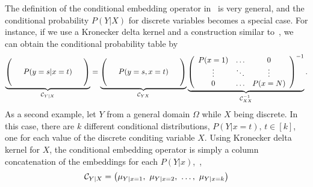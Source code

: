 \documentclass[11pt]{article}
\begin{document}
The definition of the conditional embedding operator in~ is very general, and the conditional probability $P(Y|X)$ for discrete variables becomes a special case. For instance, if we use a Kronecker delta kernel and a construction similar to~, we can obtain the conditional probability table by
\begin{align}
    \underbrace{\left(
        \begin{array}{ccc}
             &  &  \cr
            &  P(y=s|x=t) & \cr
            & &
        \end{array}
    \right)}_{\mathcal{C}_{Y|X}}
    =
    \underbrace{
    \left(
        \begin{array}{ccc}
            & & \cr
            & P(y=s, x=t) & \cr
            & &
        \end{array}
    \right)}_{\mathcal{C}_{YX}}
    \underbrace{
    \left(
        \begin{array}{ccc}
            P(x=1) & \ldots & 0 \cr
            \vdots &  \ddots & \vdots \cr
            0 & \ldots & P(x=N)
        \end{array}
    \right)^{\Large -1}}_{\mathcal{C}_{XX}^{-1}}. \label{eq:conditionalprobabilitytable}
\end{align}
As a second example, let $Y$ from a general domain $\Omega$ while $X$ being discrete. In this case, there are $k$ different conditional distributions, $P(Y|x=t),\,t\in[k]$, one for each value of the discrete conditing variable $X$. Using Kronecker delta kernel for $X$, the conditional embedding operator is simply a column concatenation of the embeddings for each $P(Y|x)$,~\ie,
\begin{align}
  \mathcal{C}_{Y|X} = \left(\mu_{Y|x=1},\ \mu_{Y|x=2},\ \ldots,\ \mu_{Y|x=k}\right)
\end{align}
\end{document}
